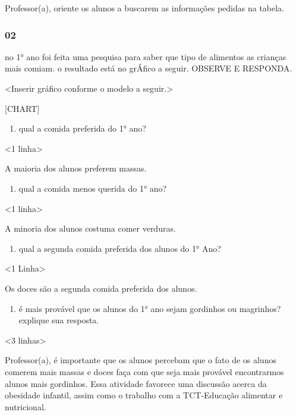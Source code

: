 Professor(a), oriente os alunos a buscarem as informações pedidas na
tabela.

\subsubsection{02}\label{section-77}

no 1° ano foi feita uma pesquisa para saber que tipo de alimentos as
crianças mais comiam. o resultado está no grÁfico a seguir. OBSERVE E
RESPONDA.

\textless{}Inserir gráfico conforme o modelo a seguir.\textgreater{}

{{[}CHART{]}}

\begin{enumerate}
\def\labelenumi{\Alph{enumi})}
\item
  qual a comida preferida do 1° ano?
\end{enumerate}

\textless{}1 linha\textgreater{}

A maioria dos alunos preferem massas.

\begin{enumerate}
\def\labelenumi{\Alph{enumi})}
\item
  qual a comida menos querida do 1° ano?
\end{enumerate}

\textless{}1 linha\textgreater{}

A minoria dos alunos costuma comer verduras.

\begin{enumerate}
\def\labelenumi{\Alph{enumi})}
\item
  qual a segunda comida preferida dos alunos do 1° Ano?
\end{enumerate}

\textless{}1 Linha\textgreater{}

Os doces são a segunda comida preferida dos alunos.

\begin{enumerate}
\def\labelenumi{\Alph{enumi})}
\item
  é mais provável que os alunos do 1° ano sejam gordinhos ou magrinhos?
  explique sua resposta.
\end{enumerate}

\textless{}3 linhas\textgreater{}

Professor(a), é importante que os alunos percebam que o fato de os
alunos comerem mais massas e doces faça com que seja mais provável
encontrarmos alunos mais gordinhos. Essa atividade favorece uma
discussão acerca da obesidade infantil, assim como o trabalho com a
TCT-Educação alimentar e nutricional.

